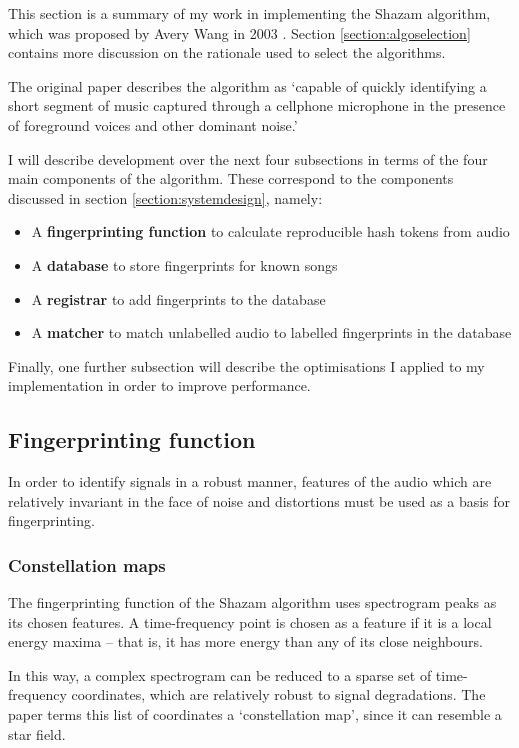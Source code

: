 \documentclass[12pt,a4paper,twoside,openright]{report}
\begin{document}
This section is a summary of my work in implementing the Shazam algorithm, which was proposed by Avery Wang in 2003 \cite{Wang03}. Section \ref{section:algoselection} contains more discussion on the rationale used to select the algorithms.

The original paper describes the algorithm as `capable of quickly identifying a short segment of music captured through a cellphone microphone in the presence of foreground voices and other dominant noise.' %

I will describe development over the next four subsections in terms of the four main components of the algorithm. These correspond to the components discussed in section \ref{section:systemdesign}, namely: 

\begin{itemize}
  \item A \textbf{fingerprinting function} to calculate reproducible hash tokens from audio
  \item A \textbf{database} to store fingerprints for known songs
  \item A \textbf{registrar} to add fingerprints to the database
  \item A \textbf{matcher} to match unlabelled audio to labelled fingerprints in the database
\end{itemize}

Finally, one further subsection will describe the optimisations I applied to my implementation in order to improve performance.

\subsection{Fingerprinting function}

In order to identify signals in a robust manner, features of the audio which are relatively invariant in the face of noise and distortions must be used as a basis for fingerprinting.

\subsubsection{Constellation maps}

The fingerprinting function of the Shazam algorithm uses spectrogram peaks as its chosen features. A time-frequency point is chosen as a feature if it is a local energy maxima -- that is, it has more energy than any of its close neighbours.

In this way, a complex spectrogram can be reduced to a sparse set of time-frequency coordinates, which are relatively robust to signal degradations. The paper terms this list of coordinates a `constellation map', since it can resemble a star field. 
\end{document}
